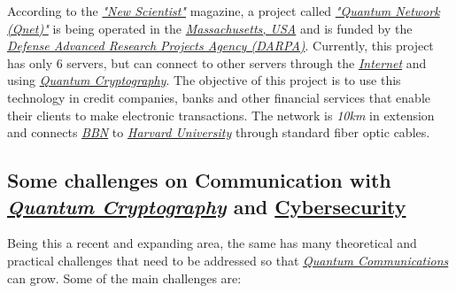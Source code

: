 \documentclass[conference]{IEEEtran}
\begin{document}
\vspace{4pt}

According to the \href{https://en.wikipedia.org/wiki/New_Scientist}{\textit{"New Scientist"}} magazine, a project called \href{http://www.e-quantum.com/qnet.php}{\textit{"Quantum Network (Qnet)"}} is being operated in the \href{https://en.wikipedia.org/wiki/Massachusetts}{\textit{Massachusetts, USA}} and is funded by the \href{https://en.wikipedia.org/wiki/DARPA}{\textit{Defense Advanced Research Projects Agency (DARPA)}}. Currently, this project has only 6 servers, but can connect to other servers through the \href{https://en.wikipedia.org/wiki/Internet}{\textit{Internet}} and using \href{https://en.wikipedia.org/wiki/Quantum_cryptography}{\textit{Quantum Cryptography}}. The objective of this project is to use this technology in credit companies, banks and other financial services that enable their clients to make electronic transactions. The network is \textit{10km} in extension and connects \href{https://en.wikipedia.org/wiki/BBN_Technologies}{\textit{BBN}} to \href{https://en.wikipedia.org/wiki/Harvard_University}{\textit{Harvard University}} through standard fiber optic cables.

\vspace{6pt}

\subsection{Some challenges on Communication with \\\href{https://en.wikipedia.org/wiki/Quantum_cryptography}{\textit{Quantum Cryptography}} and \href{https://en.wikipedia.org/wiki/Computer_security}{Cybersecurity}}

Being this a recent and expanding area, the same has many theoretical and practical challenges that need to be addressed so that \href{https://en.wikipedia.org/wiki/Quantum_information_science}{\textit{Quantum Communications}} can grow. Some of the main challenges are:
\end{document}
